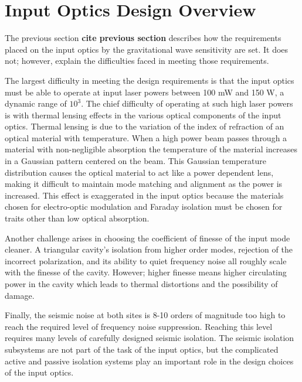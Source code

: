
\section{Input Optics Design Overview}
\label{sec:input_optics_design}

The previous section \textbf{cite previous section} describes how the requirements placed on the 
input optics by the gravitational wave sensitivity are set.  
It does not; however, explain the difficulties faced in meeting those requirements.  

The largest difficulty in meeting the design requirements is that the input optics 
must be able to operate at input laser powers between 100 mW and 150 W, 
a dynamic range of $10^3$.  
The chief difficulty of operating at such high laser powers is with thermal lensing 
effects in the various optical components of the input optics.  
Thermal lensing is due to the variation of the index of refraction of an optical 
material with temperature.  
When a high power beam passes through a material with non-negligible absorption 
the temperature of the material increases in a Gaussian pattern centered on the beam.  
This Gaussian temperature distribution causes the optical material to act like a power 
dependent lens, making it difficult to maintain mode matching and alignment as the power 
is increased.  
This effect is exaggerated in the input optics because the materials chosen for electro-optic 
modulation and Faraday isolation must be chosen for traits other than low optical absorption.

Another challenge arises in choosing the coefficient of finesse of the input mode cleaner.  
A triangular cavity's isolation from higher order modes, rejection of the incorrect polarization, 
and its ability to quiet frequency noise all roughly scale with the finesse of the cavity.  
However; higher finesse means higher circulating power in the cavity which leads to thermal 
distortions and the possibility of damage.  

Finally, the seismic noise at both sites is 8-10 orders of magnitude too high to reach 
the required level of frequency noise suppression.  
Reaching this level requires many levels of carefully designed seismic isolation.  
The seismic isolation subsystems are not part of the task of the input optics, but 
the complicated active and passive isolation systems play an important role in 
the design choices of the input optics.  

